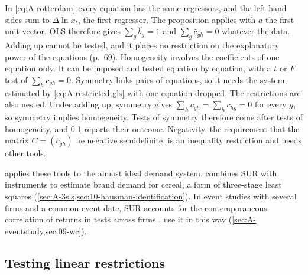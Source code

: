 In \eqref{eq:A-rotterdam} every equation has the same regressors, and the left-hand sides sum to
$\Delta\ln\bar x_t$, the first regressor. The proposition applies with $a$ the first unit vector. OLS therefore
gives $\sum_g\hat b_g = 1$ and $\sum_g\hat c_{gh} = 0$ whatever the data. Adding up cannot be tested, and it places
no restriction on the explanatory power of the equations (p.~69). Homogeneity involves the coefficients of one
equation only. It can be imposed and tested equation by equation, with a $t$ or $F$ test of $\sum_hc_{gh} = 0$.
Symmetry links pairs of equations, so it needs the system, estimated by \eqref{eq:A-restricted-gls} with one
equation dropped. The restrictions are also nested. Under adding up, symmetry gives
$\sum_hc_{gh} = \sum_hc_{hg} = 0$ for every $g$, so symmetry implies homogeneity. Tests of symmetry therefore come
after tests of homogeneity, and \cref{sec:A-wald} reports their outcome. Negativity, the requirement that the matrix
$C = (c_{gh})$ be negative semidefinite, is an inequality restriction and needs other tools.

 applies these tools to the almost ideal demand system. \citet{Hausman1997}
combines SUR with instruments to estimate brand demand for cereal, a form of three-stage least squares
(\cref{sec:A-3sls,sec:10-hausman-identification}). In event studies with several firms and a common event
date, SUR accounts for the contemporaneous correlation of returns in tests across firms \citep[pp.~172--173]{Binder1985}.
 use it in this way (\cref{sec:A-eventstudy,sec:09-wc}).

\subsection{Testing linear restrictions}\label{sec:A-wald}

